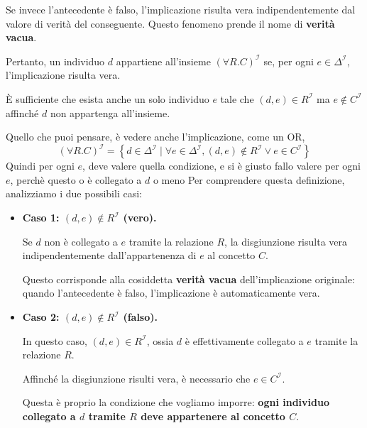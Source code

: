 Se invece l'antecedente è falso, l'implicazione risulta vera
indipendentemente dal valore di verità del conseguente.
Questo fenomeno prende il nome di \textbf{verità vacua}.

Pertanto, un individuo $d$ appartiene all'insieme
$(\forall R.C)^{\mathcal I}$ se, per ogni $e \in \Delta^{\mathcal I}$,
l'implicazione risulta vera.

È sufficiente che esista anche un solo individuo $e$ tale che
$(d,e) \in R^{\mathcal I}$ ma $e \notin C^{\mathcal I}$
affinché $d$ non appartenga all'insieme.


Quello che puoi pensare, è vedere anche l'implicazione, come un OR,
\[
(\forall R.C)^{\mathcal I}
=
\left\{
d\in\Delta^{\mathcal I}
\mid
\forall e\in\Delta^{\mathcal I},
(d,e)\notin R^{\mathcal I}\lor e\in C^{\mathcal I}
\right\}
\]
Quindi per ogni $e$, deve valere quella condizione, e si è giusto fallo valere per ogni $e$, perchè questo o è collegato a $d$ o meno
Per comprendere questa definizione, analizziamo i due possibili casi:

\begin{itemize}
    \item \textbf{Caso 1: $(d,e)\notin R^{\mathcal I}$ (vero).}

    Se $d$ non è collegato a $e$ tramite la relazione $R$,
    la disgiunzione risulta vera indipendentemente
    dall'appartenenza di $e$ al concetto $C$.

    Questo corrisponde alla cosiddetta \textbf{verità vacua}
    dell'implicazione originale: quando l'antecedente è falso,
    l'implicazione è automaticamente vera.

    \item \textbf{Caso 2: $(d,e)\notin R^{\mathcal I}$ (falso).}

    In questo caso, $(d,e)\in R^{\mathcal I}$, ossia
    $d$ è effettivamente collegato a $e$ tramite la relazione $R$.

    Affinché la disgiunzione risulti vera, è necessario che
    $e\in C^{\mathcal I}$.

    Questa è proprio la condizione che vogliamo imporre:
    \textbf{ogni individuo collegato a $d$ tramite $R$
    deve appartenere al concetto $C$}.
\end{itemize}

